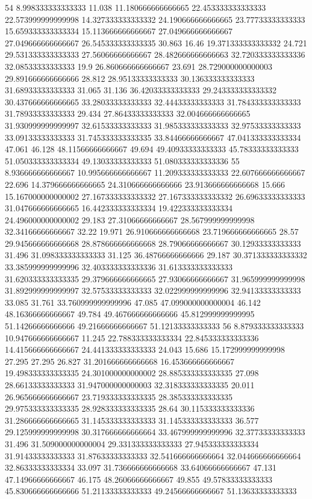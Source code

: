 54 8.998333333333333 11.038 11.180666666666665 22.453333333333333 22.573999999999998 14.327333333333332 24.190666666666665 23.77733333333333 15.659333333333334 15.113666666666667 27.049666666666667 27.049666666666667 26.545333333333335 30.863 16.46 19.371333333333332 24.721 29.531333333333333 27.56066666666667 28.482666666666663 32.720333333333336 32.08533333333333 19.9 26.860666666666667 23.691 28.729000000000003 29.891666666666666 28.812 28.95133333333333 30.136333333333333 31.68933333333333 31.065 31.136 36.42033333333333 29.243333333333332 30.437666666666665 33.28033333333333 32.44433333333333 31.784333333333333 31.78933333333333 29.434 27.86433333333333 32.004666666666665 31.930999999999997 32.61533333333333 31.985333333333333 32.97533333333333 33.09133333333333 31.745333333333335 33.84466666666667 47.041333333333334 47.061 46.128 48.11566666666667 49.694 49.40933333333333 45.78333333333333 51.050333333333334 49.13033333333333 51.080333333333336
55 8.936666666666667 10.995666666666667 11.209333333333333 22.607666666666667 22.696 14.379666666666665 24.310666666666666 23.913666666666668 15.666 15.167000000000002 27.167333333333332 27.167333333333332 26.69633333333333 31.047666666666665 16.442333333333334 19.422333333333334 24.496000000000002 29.183 27.31066666666667 28.567999999999998 32.34166666666667 32.22 19.971 26.910666666666668 23.719666666666665 28.57 29.945666666666668 28.878666666666668 28.79066666666667 30.12933333333333 31.496 31.098333333333333 31.125 36.48766666666666 29.187 30.371333333333332 33.385999999999996 32.403333333333336 31.613333333333333 31.620333333333335 29.379666666666665 27.93066666666667 31.965999999999998 31.892999999999997 32.57533333333333 32.022999999999996 32.94133333333333 33.085 31.761 33.760999999999996 47.085 47.099000000000004 46.142 48.16366666666667 49.784 49.467666666666666 45.812999999999995 51.14266666666666 49.21666666666667 51.12133333333333
56 8.879333333333333 10.947666666666667 11.245 22.788333333333334 22.845333333333336 14.415666666666667 24.441333333333333 24.043 15.686 15.172999999999998 27.295 27.295 26.827 31.201666666666668 16.453666666666667 19.498333333333335 24.301000000000002 28.885333333333335 27.098 28.66133333333333 31.947000000000003 32.318333333333335 20.011 26.965666666666667 23.719333333333335 28.385333333333335 29.975333333333335 28.928333333333335 28.64 30.115333333333336 31.286666666666665 31.145333333333333 31.145333333333333 36.577 29.125999999999998 30.317666666666664 33.467999999999996 32.37733333333333 31.496 31.509000000000004 29.331333333333333 27.945333333333334 31.91433333333333 31.87633333333333 32.541666666666664 32.044666666666664 32.86333333333334 33.097 31.736666666666668 33.64066666666667 47.131 47.14966666666667 46.175 48.26066666666667 49.855 49.57833333333333 45.830666666666666 51.21133333333333 49.24566666666667 51.13633333333333

